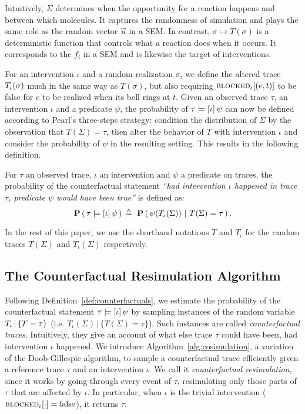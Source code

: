 Intuitively, $\Sigma$ determines when the opportunity for a reaction
happens and between which molecules. It captures the randomness of
simulation and plays the same role as the random vector $\vec u$ in a
SEM. In contrast, $\sigma \mapsto T(\sigma)$ is a deterministic
function that controls what a reaction does when it occurs.  It
corresponds to the $f_i$ in a SEM and is likewise the target of
interventions.


For an intervention $\iota$ and a random realization $\sigma$, we
define the altered trace ${T_\iota}{}(\sigma)$ much in the same way as
$T(\sigma)$, but also requiring ${\textsc{blocked}}_{\iota}[(e, t)]$ to be false
for $e$ to be realized when its bell rings at $t$.  Given an observed
trace $\tau$, an intervention $\iota$ and a predicate $\psi$, the
probability of $\tau \models [\iota] \, \psi{}$ can now be defined according to Pearl's
three-steps strategy: \ItAbduction{} condition the distribution of
$\Sigma$ by the observation that $T(\Sigma)\!=\!\tau$, then
\ItAction{} alter the behavior of $T$  with intervention
$\iota$ and \ItPrediction{} consider the probability of $\psi$ in the
resulting setting. This results in the following definition.

\begin{definition}
\label{def:counterfactuals}
  For $\tau$ an observed trace, $\iota$ an intervention and $\psi$ a
  predicate on traces, the probability of the counterfactual statement
  \textit{``had intervention $\iota$ happened in trace $\tau$,
    predicate $\psi$ would have been true''} is defined as:
  \[ \PCFST{} \eqdef \ \ProbParen{\psi(\ATRAJ{}(\Sigma)) \ |\ T(\Sigma) = \tau}. \]
\end{definition}
In the rest of this paper, we use the shorthand notations $T$ and
$T_\iota$ for the random traces $T(\Sigma)$ and $T_\iota(\Sigma)$
respectively.

\subsection{The Counterfactual Resimulation Algorithm}
\label{subsec:cosim-algo}

Following Definition~\ref{def:counterfactuals}, we estimate the
probability of the counterfactual statement $\tau \models [\iota] \, \psi{}$ by sampling
instances of the random variable ${T_\iota\,|\,\{T=\tau\}}{}$ 
(i.e. $T_\iota(\Sigma) \,|\, \{ T(\Sigma) = \tau \}$). 
Such instances are called
\emph{counterfactual traces}. Intuitively, they give an account of
what else trace $\tau$ could have been, had intervention $\iota$
happened.  We introduce Algorithm~\ref{alg:cosimulation}, a variation
of the Doob-Gillespie algorithm, to sample a counterfactual trace
efficiently given a reference trace $\tau$ and an intervention
$\iota$. We call it \emph{counterfactual resimulation}, since it works
by going through every event of $\tau$, resimulating only those parts
of $\tau$ that are affected by $\iota$. In particular, when $\iota$ is
the trivial intervention (${\textsc{blocked}}_{\iota}[\cdot] = \text{false}$), it
returns $\tau$.

